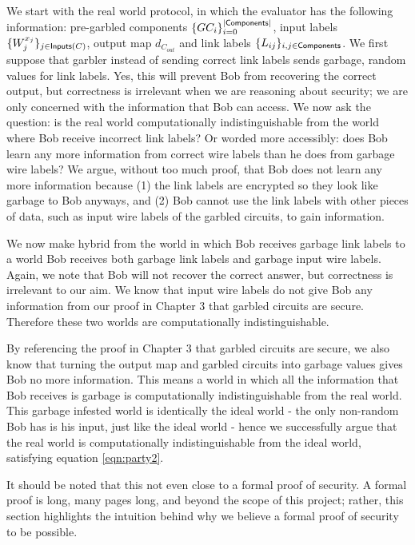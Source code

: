 We start with the real world protocol, in which the evaluator has the following information: pre-garbled components $\{GC_i\}_{i = 0}^{|\textsf{Components}|}$, input labels $\{W_j^{x_j}\}_{j \in \textsf{Inputs}(C)}$, output map $d_{C_{out}}$ and link labels $\{L_{ij}\}_{i,j \in \textsf{Components}}$.
We first suppose that garbler instead of sending correct link labels sends garbage, random values for link labels. 
Yes, this will prevent Bob from recovering the correct output, but correctness is irrelevant when we are reasoning about security; we are only concerned with the information that Bob can access. 
We now ask the question: is the real world computationally indistinguishable from the world where Bob receive incorrect link labels?
Or worded more accessibly: does Bob learn any more information from correct wire labels than he does from garbage wire labels?
We argue, without too much proof, that Bob does not learn any more information because (1) the link labels are encrypted so they look like garbage to Bob anyways, and (2) Bob cannot use the link labels with other pieces of data, such as input wire labels of the garbled circuits, to gain information. 

We now make hybrid from the world in which Bob receives garbage link labels to a world Bob receives both garbage link labels and garbage input wire labels. 
Again, we note that Bob will not recover the correct answer, but correctness is irrelevant to our aim. 
We know that input wire labels do not give Bob any information from our proof in Chapter 3 that garbled circuits are secure. 
Therefore these two worlds are computationally indistinguishable. 

By referencing the proof in Chapter 3 that garbled circuits are secure, we also know that turning the output map and garbled circuits into garbage values gives Bob no more information.
This means a world in which all the information that Bob receives is garbage is computationally indistinguishable from the real world.
This garbage infested world is identically the ideal world - the only non-random Bob has is his input, just like the ideal world - hence we successfully argue that the real world is computationally indistinguishable from the ideal world, satisfying equation \ref{eqn:party2}. 

It should be noted that this not even close to a formal proof of security.
A formal proof is long, many pages long, and beyond the scope of this project; rather, this section highlights the intuition behind why we believe a formal proof of security to be possible. 

